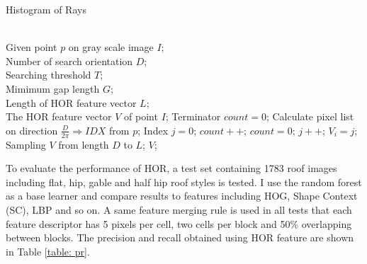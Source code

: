 \documentclass{iitthesis}
\begin{document}
{\linespread{1.5}
\begin{algorithm}[htb]   
	\caption{ Histogram of Rays}   
	\label{alg: 2}   
	\begin{algorithmic}[1] 
		\REQUIRE ~~\\
		Given point $p$ on gray scale image $I$;\\
		Number of search orientation $D$;\\
		Searching threshold $T$;\\
		Mimimum gap length $G$;\\
		Length of HOR feature vector $L$;
		\ENSURE ~~\\  
		The HOR feature vector $V$ of point $I$; 
			\STATE Terminator $count = 0$;
			\STATE Calculate pixel list on direction $\frac{D}{2\pi} \Rightarrow IDX$ from $p$;
			\STATE Index $j=0$;
					\STATE $count ++$;
				\ELSE
					\STATE $count = 0$;
				\ENDIF
				\STATE $j ++$;
			\ENDWHILE
			\STATE $V_i = j$;
		\ENDFOR 
		\STATE Sampling $V$ from length $D$ to $L$;
		\RETURN $V$; 
	\end{algorithmic}  
\end{algorithm} 
}

To evaluate the performance of HOR, a test set containing 1783 roof images including flat, hip, gable and half hip roof styles is tested. I use the random forest as a base learner and compare results to features including HOG, Shape Context (SC), LBP and so on. A same feature merging rule is used in all tests that each feature descriptor has 5 pixels per cell, two cells per block and 50\% overlapping between blocks. The precision and recall obtained using HOR feature are shown in Table \ref{table: pr}.
\end{document}
